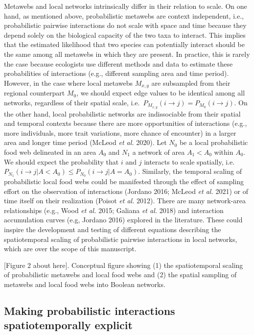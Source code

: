 \documentclass[11pt]{article}
\begin{document}
Metawebs and local networks intrinsically differ in their relation to
scale. On one hand, as mentioned above, probabilistic metawebs are
context independent, i.e., probabilistic pairwise interactions do not
scale with space and time because they depend solely on the biological
capacity of the two taxa to interact. This implies that the estimated
likelihood that two species can potentially interact should be the same
among all metawebs in which they are present. In practice, this is
rarely the case because ecologists use different methods and data to
estimate these probabilities of interactions (e.g., different sampling
area and time period). However, in the case where local metawebs
\(M_{x,y}\) are subsampled from their regional counterpart \(M_0\), we
should expect edge values to be identical among all networks, regardless
of their spatial scale,
i.e.~\(P_{M_{x,y}}(i \rightarrow j) = P_{M_0}(i \rightarrow j)\). On the
other hand, local probabilistic networks are indissociable from their
spatial and temporal contexts because there are more opportunities of
interactions (e.g., more individuals, more trait variations, more chance
of encounter) in a larger area and longer time period (McLeod \emph{et
al.} 2020). Let \(N_0\) be a local probabilistic food web delineated in
an area \(A_0\) and \(N_1\) a network of area \(A_1 < A_0\) within
\(A_0\). We should expect the probability that \(i\) and \(j\) interacts
to scale spatially,
i.e.~\(P_{N_1}(i \rightarrow j | A < A_0) \le P_{N_0}(i \rightarrow j | A = A_0)\).
Similarly, the temporal scaling of probabilistic local food webs could
be manifested through the effect of sampling effort on the observation
of interactions (Jordano 2016; McLeod \emph{et al.} 2021) or of time
itself on their realization (Poisot \emph{et al.} 2012). There are many
network-area relationships (e.g., Wood \emph{et al.} 2015; Galiana
\emph{et al.} 2018) and interaction accumulation curves (e.g, Jordano
2016) explored in the literature. These could inspire the development
and testing of different equations describing the spatiotemporal scaling
of probabilistic pairwise interactions in local networks, which are over
the scope of this manuscript.

{[}Figure 2 about here{]}. Conceptual figure showing (1) the
spatiotemporal scaling of probabilistic metawebs and local food webs and
(2) the spatial sampling of metawebs and local food webs into Boolean
networks.

\hypertarget{making-probabilistic-interactions-spatiotemporally-explicit}{%
\subsection{Making probabilistic interactions spatiotemporally
explicit}\label{making-probabilistic-interactions-spatiotemporally-explicit}}
\end{document}
